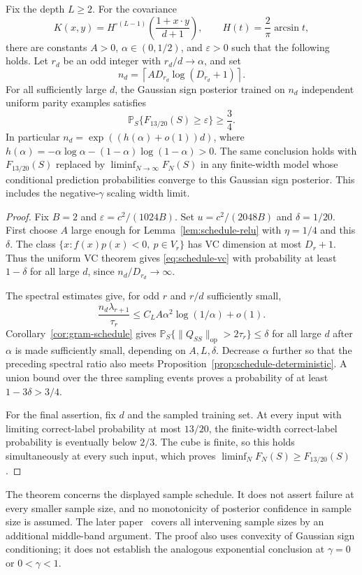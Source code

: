 \begin{theorem}
\label{thm:exponential-schedule}
Fix the depth $L\ge2$. For the covariance
\[
 K(x,y)=H^{\circ(L-1)}\!\left(\frac{1+x\cdot y}{d+1}\right),
 \qquad H(t)=\frac2\pi\arcsin t,
\]
there are constants $A>0$, $\alpha\in(0,1/2)$, and $\varepsilon>0$
such that the following holds. Let $r_d$ be an odd integer with
$r_d/d\to\alpha$, and set
\[
 n_d=\left\lceil A D_{r_d}\log(D_{r_d}+1)\right\rceil.
\]
For all sufficiently large $d$, the Gaussian sign posterior trained on
$n_d$ independent uniform parity examples satisfies
\[
 \mathbb P_S\{F_{13/20}(S)\ge\varepsilon\}\ge\frac34.
\]
In particular $n_d=\exp((h(\alpha)+o(1))d)$, where
$h(\alpha)=-\alpha\log\alpha-(1-\alpha)\log(1-\alpha)>0$.
The same conclusion holds with $F_{13/20}(S)$ replaced by
$\liminf_{N\to\infty}F_N(S)$ in any finite-width model whose conditional
prediction probabilities converge to this Gaussian sign posterior.
This includes the negative-$\gamma$ scaling width limit.
\end{theorem}
\begin{proof}
Fix $B=2$ and $\varepsilon=c^2/(1024B)$. Set
$u=c^2/(2048B)$ and $\delta=1/20$. First choose $A$ large enough
for Lemma~\ref{lem:schedule-relu} with $\eta=1/4$ and this $\delta$.
The class $\{x: f(x)p(x)<0,\ p\in V_r\}$ has VC dimension at most
$D_r+1$. Thus the uniform VC theorem \cite{vapnik1971} gives
\eqref{eq:schedule-vc} with probability at least $1-\delta$ for all
large $d$, since $n_d/D_{r_d}\to\infty$.

The spectral estimates give, for odd $r$ and $r/d$ sufficiently small,
\[
 \frac{n_d\lambda_{r+1}}{\tau_r}
 \le C_L A\alpha^2\log(1/\alpha)+o(1).
\]
Corollary~\ref{cor:gram-schedule} gives
$\mathbb P_S\{\|Q_{SS}\|_{\mathrm{op}}>2\tau_r\}\le\delta$
for all large $d$ after $\alpha$ is made sufficiently small, depending
on $A,L,\delta$. Decrease $\alpha$ further so that the preceding spectral
ratio also meets Proposition~\ref{prop:schedule-deterministic}.
A union bound over the three sampling events proves a probability of
at least $1-3\delta>3/4$.

For the final assertion, fix $d$ and the sampled training set. At every
input with limiting correct-label probability at most $13/20$, the
finite-width correct-label probability is eventually below $2/3$.
The cube is finite, so this holds simultaneously at every such input,
which proves $\liminf_N F_N(S)\ge F_{13/20}(S)$.
\end{proof}

The theorem concerns the displayed sample schedule. It does not assert
failure at every smaller sample size, and no monotonicity of posterior
confidence in sample size is assumed. The later paper~\cite{gaussian-all-n} covers all intervening sample sizes
by an additional middle-band argument. The proof
also uses convexity of Gaussian sign conditioning; it does not establish
the analogous exponential conclusion at $\gamma=0$ or $0<\gamma<1$.
